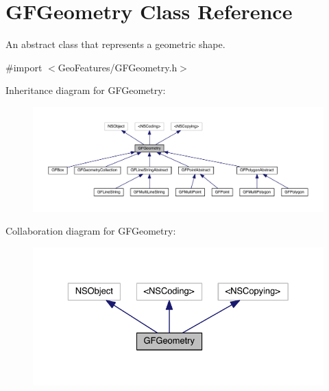 \hypertarget{interface_g_f_geometry}{}\section{G\+F\+Geometry Class Reference}
\label{interface_g_f_geometry}


An abstract class that represents a geometric shape.  




{\ttfamily \#import $<$Geo\+Features/\+G\+F\+Geometry.\+h$>$}



Inheritance diagram for G\+F\+Geometry\+:\nopagebreak
\begin{figure}[H]
\begin{center}
\leavevmode
\includegraphics[width=350pt]{interface_g_f_geometry__inherit__graph}
\end{center}
\end{figure}


Collaboration diagram for G\+F\+Geometry\+:\nopagebreak
\begin{figure}[H]
\begin{center}
\leavevmode
\includegraphics[width=329pt]{interface_g_f_geometry__coll__graph}
\end{center}
\end{figure}
